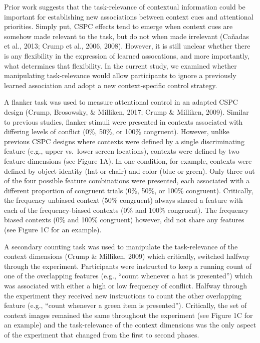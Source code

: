 \documentclass[english,,man,floatsintext]{apa6}
\begin{document}
Prior work suggests that the task-relevance of contextual information could be important for establishing new associations between context cues and attentional priorities. Simply put, CSPC effects tend to emerge when context cues are somehow made relevant to the task, but do not when made irrelevant (Cañadas et al., 2013; Crump et al., 2006, 2008). However, it is still unclear whether there is any flexibility in the expression of learned assocations, and more importantly, what determines that flexibility. In the current study, we examined whether manipulating task-relevance would allow participants to ignore a previously learned association and adopt a new context-specific control strategy.

A flanker task was used to measure attentional control in an adapted CSPC design (Crump, Brosowsky, \& Milliken, 2017; Crump \& Milliken, 2009). Similar to previous studies, flanker stimuli were presented in contexts associated with differing levels of conflict (0\%, 50\%, or 100\% congruent). However, unlike previous CSPC designs where contexts were defined by a single discriminating feature (e.g., upper vs.~lower screen locations), contexts were defined by two feature dimensions (see Figure 1A). In one condition, for example, contexts were defined by object identity (hat or chair) and color (blue or green). Only three out of the four possible feature combinations were presented, each associated with a different proportion of congruent trials (0\%, 50\%, or 100\% congruent). Critically, the frequency unbiased context (50\% congruent) always shared a feature with each of the frequency-biased contexts (0\% and 100\% congruent). The frequency biased contexts (0\% and 100\% congruent) however, did not share any features (see Figure 1C for an example).

A secondary counting task was used to manipulate the task-relevance of the context dimensions (Crump \& Milliken, 2009) which critically, switched halfway through the experiment. Participants were instructed to keep a running count of one of the overlapping features (e.g., \enquote{count whenever a hat is presented}) which was associated with either a high or low frequency of conflict. Halfway through the experiment they received new instructions to count the other overlapping feature (e.g., \enquote{count whenever a green item is presented}). Critically, the set of context images remained the same throughout the experiment (see Figure 1C for an example) and the task-relevance of the context dimensions was the only aspect of the experiment that changed from the first to second phases.
\end{document}
